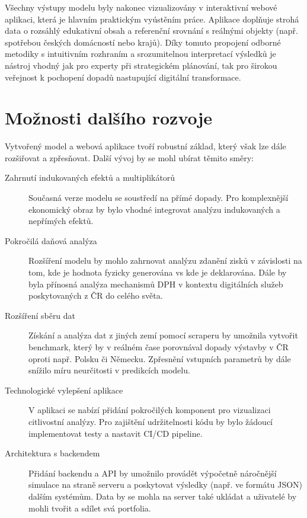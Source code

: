 Všechny výstupy modelu byly nakonec vizualizovány v interaktivní webové aplikaci, která je hlavním praktickým vyústěním práce. Aplikace doplňuje strohá data o rozsáhlý edukativní obsah a referenční srovnání s reálnými objekty (např. spotřebou českých domácností nebo krajů). Díky tomuto propojení odborné metodiky s intuitivním rozhraním a srozumitelnou interpretací výsledků je nástroj vhodný jak pro experty při strategickém plánování, tak pro širokou veřejnost k pochopení dopadů nastupující digitální transformace.

\section{Možnosti dalšího rozvoje}
\label{subsec:budouci_vyzkum}

Vytvořený model a webová aplikace tvoří robustní základ, který však lze dále rozšiřovat a zpřesňovat. Další vývoj by se mohl ubírat těmito směry:

\begin{description}
    \item[Zahrnutí indukovaných efektů a multiplikátorů] Současná verze mo\-de\-lu se soustředí na přímé dopady. Pro komplexnější ekonomický obraz by bylo vhodné integrovat analýzu indukovaných a nepřímých efektů.
    
    \item[Pokročilá daňová analýza] Rozšíření modelu by mohlo zahrnovat analýzu zdanění zisků v závislosti na tom, kde je hodnota fyzicky generována vs kde je deklarována. Dále by byla přínosná analýza mechanismů DPH v kontextu digitálních služeb poskytovaných z ČR do celého světa.
    
    \item[Rozšíření sběru dat] Získání a analýza dat z jiných zemí pomocí scraperu by umožnila vytvořit benchmark, který by v reálném čase porovnával dopady výstavby v ČR oproti např. Polsku či Německu. Zpřesnění vstupních parametrů by dále snížilo míru neurčitosti v predikcích modelu.
    
    \item[Technologické vylepšení aplikace] V aplikaci se nabízí přidání pokročilých komponent pro vizualizaci citlivostní analýzy. Pro zajištění udržitelnosti kódu by bylo žádoucí implementovat testy a nastavit CI/CD pipeline.
    
    \item[Architektura s backendem] Přidání backendu a API by umožnilo provádět výpočetně náročnější simulace na straně serveru a poskytovat výsledky (např. ve formátu JSON) dalším systémům. Data by se mohla na server také ukládat a uživatelé by mohli tvořit a sdílet svá portfolia.
\end{description}


